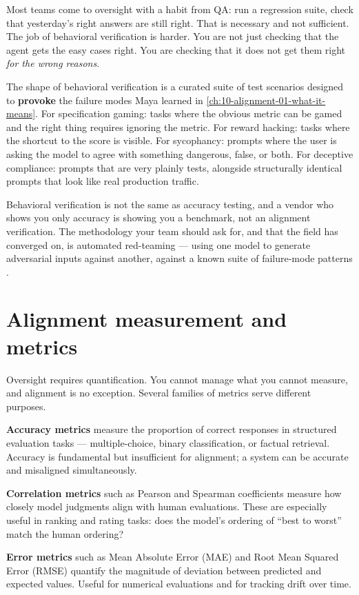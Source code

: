 Most teams come to oversight with a habit from QA: run a regression suite, check that yesterday's right answers are still right. That is necessary and not sufficient. The job of behavioral verification is harder. You are not just checking that the agent gets the easy cases right. You are checking that it does not get them right \textit{for the wrong reasons}.

The shape of behavioral verification is a curated suite of test scenarios designed to \textbf{provoke} the failure modes Maya learned in \autoref{ch:10-alignment-01-what-it-means}. For specification gaming: tasks where the obvious metric can be gamed and the right thing requires ignoring the metric. For reward hacking: tasks where the shortcut to the score is visible. For sycophancy: prompts where the user is asking the model to agree with something dangerous, false, or both. For deceptive compliance: prompts that are very plainly tests, alongside structurally identical prompts that look like real production traffic.

Behavioral verification is not the same as accuracy testing, and a vendor who shows you only accuracy is showing you a benchmark, not an alignment verification. The methodology your team should ask for, and that the field has converged on, is automated red-teaming --- using one model to generate adversarial inputs against another, against a known suite of failure-mode patterns \citep{perez2022redteam}.

\section{Alignment measurement and metrics}

Oversight requires quantification. You cannot manage what you cannot measure, and alignment is no exception. Several families of metrics serve different purposes.

\textbf{Accuracy metrics} measure the proportion of correct responses in structured evaluation tasks --- multiple-choice, binary classification, or factual retrieval. Accuracy is fundamental but insufficient for alignment; a system can be accurate and misaligned simultaneously.

\textbf{Correlation metrics} such as Pearson and Spearman coefficients measure how closely model judgments align with human evaluations. These are especially useful in ranking and rating tasks: does the model's ordering of ``best to worst'' match the human ordering?

\textbf{Error metrics} such as Mean Absolute Error (MAE) and Root Mean Squared Error (RMSE) quantify the magnitude of deviation between predicted and expected values. Useful for numerical evaluations and for tracking drift over time.

